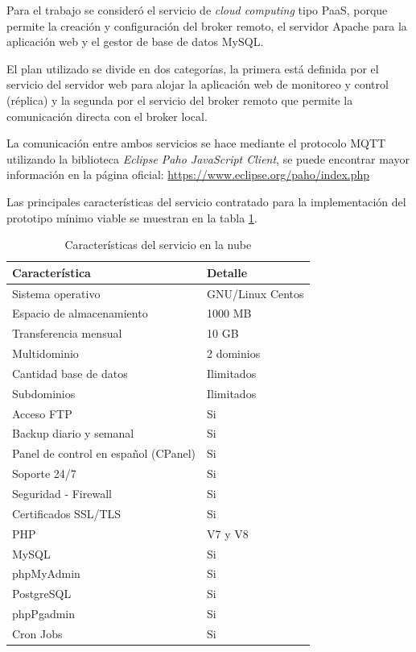 Para el trabajo se consideró el servicio de \emph{cloud computing} tipo PaaS, porque permite la creación y configuración del broker remoto, el servidor Apache para la aplicación web y el gestor de base de datos MySQL.

El plan utilizado se divide en dos categorías, la primera está definida por el servicio del servidor web para alojar la aplicación web de monitoreo y control (réplica) y la segunda por el servicio del broker remoto que permite la comunicación directa con el broker local. 

La comunicación entre ambos servicios se hace mediante el protocolo MQTT utilizando la biblioteca  \emph{Eclipse Paho JavaScript Client}, se puede encontrar mayor información en la página oficial: \url{https://www.eclipse.org/paho/index.php} 

Las principales características  del servicio contratado para la implementación del prototipo mínimo viable se muestran en la tabla \ref{tab:serverweb}.


\begin{table}[h]
	\centering
	\caption[Características del servicio en la nube]{Características del servicio en la nube}
	\begin{tabular}{p{7cm} p{5cm} }    
		\toprule
		\textbf{Característica} 	 & \textbf{Detalle}  \\
		\midrule
		Sistema operativo  & GNU/Linux Centos\\		
		Espacio de almacenamiento & 1000 MB \\
		Transferencia mensual  & 10 GB\\		
		Multidominio & 2 dominios\\		
		Cantidad base de datos 	  & Ilimitados\\
		Subdominios 	  & Ilimitados\\
		Acceso FTP 	  & Si\\
		Backup diario y semanal 	  & Si\\
		Panel de control en español (CPanel) 	  & Si\\
		Soporte 24/7 	  & Si\\
		Seguridad - Firewall	  & Si\\
		Certificados SSL/TLS	  & Si\\
		PHP	  & V7 y V8\\
		MySQL	  & Si\\
		phpMyAdmin	  & Si\\
		PostgreSQL	  & Si\\
		phpPgadmin	  & Si\\
		Cron Jobs	  & Si\\
		\bottomrule
		\hline
	\end{tabular}
	\label{tab:serverweb}
\end{table}

